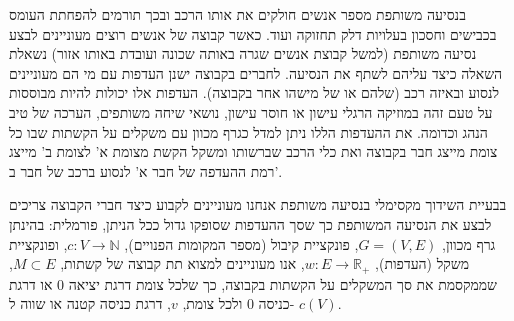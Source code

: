 \begin{hebrew}
בנסיעה משותפת מספר אנשים חולקים את אותו הרכב ובכך תורמים להפחתת העומס בכבישים וחסכון בעלויות דלק תחזוקה ועוד.
כאשר קבוצה של אנשים רוצים מעוניינים לבצע נסיעה משותפת (למשל קבוצת אנשים שגרה באותה שכונה ועובדת באותו אזור) נשאלת השאלה כיצד עליהם לשתף את הנסיעה.
לחברים בקבוצה ישנן העדפות עם מי הם מעוניינים לנסוע ובאיזה רכב (שלהם או של מישהו אחר בקבוצה).
העדפות אלו יכולות להיות מבוססות על טעם זהה במוזיקה הרגלי עישון או חוסר עישון, נושאי שיחה משותפים, הערכה של טיב הנהג וכדומה.
את ההעדפות הללו ניתן למדל כגרף מכוון עם משקלים על הקשתות שבו כל צומת מייצג חבר בקבוצה ואת כלי הרכב שברשותו ומשקל הקשת מצומת א' לצומת ב' מייצג רמת ההעדפה של חבר א' לנסוע ברכב של חבר ב'.

בבעיית השידוך מקסימלי בנסיעה משותפת אנחנו מעוניינים לקבוע כיצד חברי הקבוצה צריכים לבצע את הנסיעה המשותפת כך שסך ההעדפות שסופקו גדול ככל הניתן, פורמלית:
בהינתן גרף מכוון,
$G = (V, E)$,
פונקציית קיבול (מספר המקומות הפנויים),
$c:V \to \mathbb{N}$,
ופונקציית משקל (העדפות),
$w:E \to \mathbb{R}_+$,
אנו מעוניינים למצוא תת קבוצה של קשתות,
$M \subset E$,
שממקסמת את סך המשקלים על הקשתות בקבוצה, כך שלכל צומת דרגת יציאה 0 או דרגת כניסה 0 ולכל צומת,
$v$,
דרגת כניסה קטנה או שווה ל-%
$c(V)$.






\end{hebrew}
